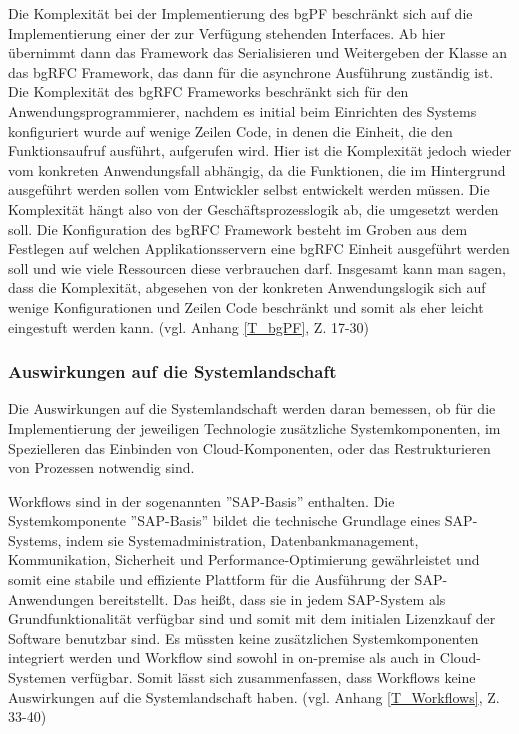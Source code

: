 Die Komplexität bei der Implementierung des bgPF beschränkt sich auf die Implementierung einer der zur Verfügung stehenden Interfaces. Ab hier übernimmt dann das Framework das Serialisieren und Weitergeben der Klasse an das bgRFC Framework, das dann für die asynchrone Ausführung zuständig ist. Die Komplexität des bgRFC Frameworks beschränkt sich für den Anwendungsprogrammierer, nachdem es initial beim Einrichten des Systems konfiguriert wurde auf wenige Zeilen Code, in denen die Einheit, die den Funktionsaufruf ausführt, aufgerufen wird. Hier ist die Komplexität jedoch wieder vom konkreten Anwendungsfall abhängig, da die Funktionen, die im Hintergrund ausgeführt werden sollen vom Entwickler selbst entwickelt werden müssen. Die Komplexität hängt also von der Geschäftsprozesslogik ab, die umgesetzt werden soll. Die Konfiguration des bgRFC Framework besteht im Groben aus dem Festlegen auf welchen Applikationsservern eine bgRFC Einheit ausgeführt werden soll und wie viele Ressourcen diese verbrauchen darf. Insgesamt kann man sagen, dass die Komplexität, abgesehen von der konkreten Anwendungslogik sich auf wenige Konfigurationen und Zeilen Code beschränkt und somit als eher leicht eingestuft werden kann. (vgl. Anhang \ref{T_bgPF}, Z. 17-30)

\subsubsection{Auswirkungen auf die Systemlandschaft}

Die Auswirkungen auf die Systemlandschaft werden daran bemessen, ob für die Implementierung der jeweiligen Technologie zusätzliche Systemkomponenten, im Spezielleren das Einbinden von Cloud-Komponenten, oder das Restrukturieren von Prozessen notwendig sind.

Workflows sind in der sogenannten ''SAP-Basis'' enthalten. Die Systemkomponente ''SAP-Basis'' bildet die technische Grundlage eines SAP-Systems, indem sie Systemadministration, Datenbankmanagement, Kommunikation, Sicherheit und Performance-Optimierung gewährleistet und somit eine stabile und effiziente Plattform für die Ausführung der SAP-Anwendungen bereitstellt. Das hei{\ss}t, dass sie in jedem SAP-System als Grundfunktionalität verfügbar sind und somit mit dem initialen Lizenzkauf der Software benutzbar sind. Es müssten keine zusätzlichen Systemkomponenten integriert werden und Workflow sind sowohl in on-premise als auch in Cloud-Systemen verfügbar. Somit lässt sich zusammenfassen, dass Workflows keine Auswirkungen auf die Systemlandschaft haben. (vgl. Anhang \ref{T_Workflows}, Z. 33-40)

